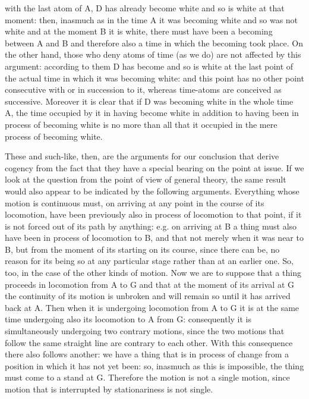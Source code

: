 with the last atom of A, D has already become white and so is white
at that moment: then, inasmuch as in the time A it was becoming white
and so was not white and at the moment B it is white, there must have
been a becoming between A and B and therefore also a time in which
the becoming took place. On the other hand, those who deny atoms of
time (as we do) are not affected by this argument: according to them
D has become and so is white at the last point of the actual time
in which it was becoming white: and this point has no other point
consecutive with or in succession to it, whereas time-atoms are conceived
as successive. Moreover it is clear that if D was becoming white in
the whole time A, the time occupied by it in having become white in
addition to having been in process of becoming white is no more than
all that it occupied in the mere process of becoming white.

These and such-like, then, are the arguments for our conclusion that
derive cogency from the fact that they have a special bearing on the
point at issue. If we look at the question from the point of view
of general theory, the same result would also appear to be indicated
by the following arguments. Everything whose motion is continuous
must, on arriving at any point in the course of its locomotion, have
been previously also in process of locomotion to that point, if it
is not forced out of its path by anything: e.g. on arriving at B a
thing must also have been in process of locomotion to B, and that
not merely when it was near to B, but from the moment of its starting
on its course, since there can be, no reason for its being so at any
particular stage rather than at an earlier one. So, too, in the case
of the other kinds of motion. Now we are to suppose that a thing proceeds
in locomotion from A to G and that at the moment of its arrival at
G the continuity of its motion is unbroken and will remain so until
it has arrived back at A. Then when it is undergoing locomotion from
A to G it is at the same time undergoing also its locomotion to A
from G: consequently it is simultaneously undergoing two contrary
motions, since the two motions that follow the same straight line
are contrary to each other. With this consequence there also follows
another: we have a thing that is in process of change from a position
in which it has not yet been: so, inasmuch as this is impossible,
the thing must come to a stand at G. Therefore the motion is not a
single motion, since motion that is interrupted by stationariness
is not single. 

